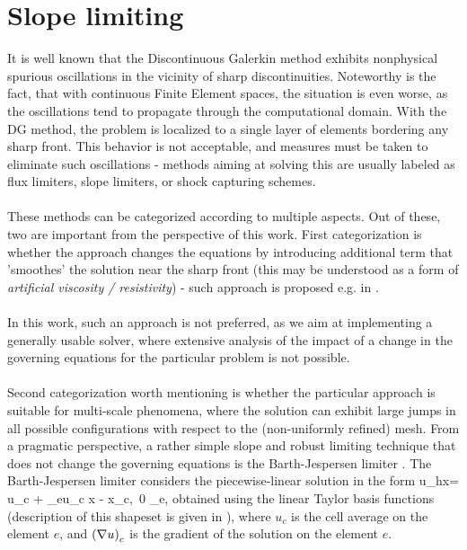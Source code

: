 \section{Slope limiting}
It is well known \cite{dolejsi2015} that the Discontinuous Galerkin method exhibits nonphysical spurious oscillations in the vicinity of sharp discontinuities. Noteworthy is the fact, that with continuous Finite Element spaces, the situation is even worse, as the oscillations tend to propagate through the computational domain. With the DG method, the problem is localized to a single layer of elements bordering any sharp front. This behavior is not acceptable, and measures must be taken to eliminate such oscillations - methods aiming at solving this are usually labeled as flux limiters, slope limiters, or shock capturing schemes.
\paragraph{}
These methods can be categorized according to multiple aspects. Out of these, two are important from the perspective of this work. First categorization is whether the approach changes the equations by introducing additional term that 'smoothes' the solution near the sharp front (this may be understood as a form of \textit{artificial viscosity / resistivity}) - such approach is proposed e.g. in \cite{DENNER201759}.
\paragraph{}
In this work, such an approach is not preferred, as we aim at implementing a generally usable solver, where extensive analysis of the impact of a change in the governing equations for the particular problem is not possible.
\paragraph{}
Second categorization worth mentioning is whether the particular approach is suitable for multi-scale phenomena, where the solution can exhibit large jumps in all possible configurations with respect to the (non-uniformly refined) mesh. From a pragmatic perspective, a rather simple slope and robust limiting technique that does not change the governing equations is the Barth-Jespersen limiter \cite{barthJespersen}.
The Barth-Jespersen limiter considers the piecewise-linear solution in the form
\be
\label{slopeLimSln}
u_h\lo x\ro = u_c + \alpha_e\lo\nabla u\ro_c \cdot \lo x - x_c\ro,\ 0 \leq \alpha_e,
\ee
obtained using the linear Taylor basis functions (description of this shapeset is given in \cite{vertex}), where $u_c$ is the cell average on the element $e$, and $\left(\nabla u\right)_c$ is the gradient of the solution on the element $e$.
